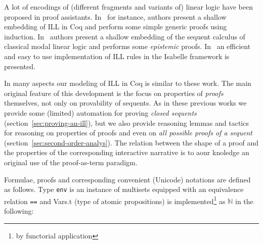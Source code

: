 \documentclass[runningheads,a4paper]{llncs}
\newcommand{\N}{\mathbb{N}}
\begin{document}
A lot of encodings of (different fragments and variants of) linear
logic have been proposed in proof assistants. In~\cite{Power99} for
instance, authors present a shallow embedding of ILL in Coq and
perform some simple generic proofs using induction.
In~\cite{Sadrzadeh03modallinear} authors present a shallow embedding
of the sequent calculus of classical modal linear logic and performs
some \emph{epistemic} proofs. In~\cite{Kalvala95mechanizinglinear} an
efficient and easy to use implementation of ILL rules in the Isabelle
framework is presented.

In many aspects our modeling of ILL in Coq is similar to these work.
The main original feature of this development is the focus on
properties of \emph{proofs} themselves, not only on provability of
sequents. As in these previous works we provide some (limited)
automation for proving \emph{closed sequents}
(section~\ref{sec:proving-an-ill}), but we also provide reasoning
lemmas and tactics for reasoning on properties of proofs and even on
\emph{all possible proofs of a sequent}
(section~\ref{sec:second-order-analys}). The relation between the
shape of a proof and the properties of the corresponding interactive
narrative is to aour knoledge an original use of the proof-as-term
paradigm.


Formulae, proofs and corresponding convenient (Unicode) notations are
defined as follows. Type \texttt{env} is an instance of multisets
equipped with an equivalence relation \texttt{==} and Vars.t (type of
atomic propositions) is implemented\footnote{by functorial
  application} as $\N$ in the following:
\end{document}
